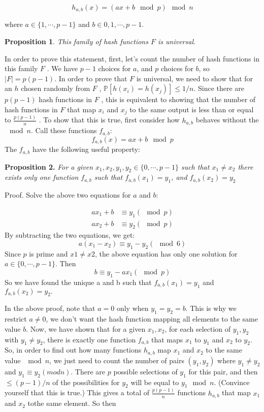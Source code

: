 \documentclass [12pt]{article}
\begin{document}
$$
h_{a,b}(x) = (ax + b \mod p) \mod n
$$

where $a \in \{1, \cdots , p - 1\}$ and $b \in {0, 1, \cdots , p - 1}$. 

\textbf{Proposition 1}. \textit{This family of hash functions $F$ is universal}. 

In order to prove this statement, first, let’s count the number of hash functions in this family $F$ . We have $p-1$ choices for $a$, and $p$ choices for $b$, so $|F| = p(p-1)$. In order to prove that $F$ is universal, we need to show that for an $h$ chosen randomly from $F$ , $\mathbb{P}[h(x_i ) = h(x_j )] \leq 1/n$. Since there are $p(p - 1)$ hash functions in $F$ , this is equivalent to showing that the number of hash functions in $F$ that map $x_i$ and $x_j$ to the same output is less than or equal to $\frac{p(p-1)}{n}$ . To show that this is true, first consider how $h_{a,b}$ behaves without the $\mod n$. Call these functions $f_{a,b}$:
$$
f_{a,b}(x) = ax + b \mod p 
$$
The $f_{a,b}$ have the following useful property: 

\textbf{Proposition 2.} \textit{For a given $x_1, x_2, y_1, y_2 \in \{0, \cdots , p - 1\}$ such that $x_1 \neq x_2$ there exists only one function $f_{a,b}$ such that $f_{a,b}(x_1) = y_1$, and $f_{a,b}(x_2) = y_2$}

 Proof. Solve the above two equations for $a$ and $b$:

 \begin{align*}
  ax_1 + b &\equiv y_1 (\mod p) \\
  ax_2 + b &\equiv y_2 (\mod p)
\end{align*}
By subtracting the two equations, we get:
$$
a(x_1 - x_2) \equiv y_1 - y_2 (\mod 6)
$$
Since $p$ is prime and $x1 \neq x2$, the above equation has only one solution for $a \in \{0, \cdots , p -1\}$.
Then
$$
b \equiv y_1 - ax_1 (\mod p)
$$
So we have found the unique a and b such that $f_{a,b}(x_1) = y_1$ and $f_{a,b}(x_2) = y_2.$

In the above proof, note that $a = 0$ only when $y_1 = y_2 = b$. This is why we restrict $a \neq 0$, we don’t want the hash function mapping all elements to the same value $b$. Now, we have shown that for a given $x_1, x_2$, for each selection of $y_1, y_2$ with $y_1 \neq y_2$, there is exactly one function $f_{a,b}$ that maps $x_1$ to $y_1$ and $x_2$ to $y_2$. So, in order to find out how many functions $h_{a,b}$ map $x_1$ and $x_2$ to the same value $\mod n$, we just need to count the number of pairs $(y_1, y_2)$ where $y_1 \neq y_2$ and $y_1 \equiv y_2 (mod n)$. There are $p$ possible selections of $y_1$ for this pair, and then $\leq (p - 1)/n$ of the possibilities for $y_2$ will be equal to $y_1 \mod n$. (Convince yourself that this is true.) This gives a total of $\frac{p(p-1)}{n}$ functions $h_{a,b}$ that map $x_1$ and $x_2$ tothe same element. So then
\end{document}
